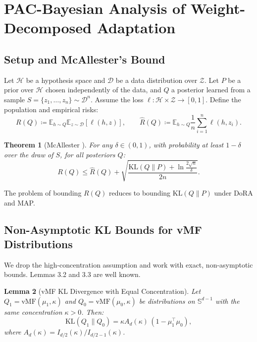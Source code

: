 \documentclass[11pt]{article}
\newtheorem{theorem}{Theorem}[section]
\newtheorem{lemma}[theorem]{Lemma}
\newcommand{\KL}{\mathrm{KL}}
\newcommand{\vMF}{\mathrm{vMF}}
\newcommand{\Ad}{A_d}
\newcommand{\Sd}{\mathbb{S}^{d-1}}
\newcommand{\E}{\mathbb{E}}
\begin{document}

\section{PAC-Bayesian Analysis of Weight-Decomposed Adaptation}
\label{sec:pac_analysis}

\subsection{Setup and McAllester's Bound}
\label{sec:setup}

Let $\mathcal{H}$ be a hypothesis space and $\mathcal{D}$ be a data
distribution over $\mathcal{Z}$.
Let $P$ be a prior over $\mathcal{H}$ chosen independently of the data,
and $Q$ a posterior learned from a sample $S = \{z_1, \ldots, z_n\} \sim
\mathcal{D}^n$.
Assume the loss $\ell : \mathcal{H} \times \mathcal{Z} \to [0,1]$.
Define the population and empirical risks:
\[
  R(Q) \coloneqq \E_{h \sim Q}\E_{z \sim \mathcal{D}}[\ell(h,z)],
  \qquad
  \hat{R}(Q) \coloneqq \E_{h \sim Q}\frac{1}{n}\sum_{i=1}^n \ell(h, z_i).
\]

\begin{theorem}[McAllester \cite{mcallester1999pac}]
\label{thm:mcallester}
For any $\delta \in (0,1)$, with probability at least $1-\delta$ over the
draw of $S$, for all posteriors $Q$:
\[
  R(Q) \leq \hat{R}(Q) + \sqrt{\frac{\KL(Q \| P) + \ln\frac{2\sqrt{n}}{\delta}}{2n}}.
\]
\end{theorem}
\noindent The problem of bounding $R(Q)$ reduces to bounding $\KL(Q \| P)$
under DoRA and MAP.

\subsection{Non-Asymptotic KL Bounds for vMF Distributions}
\label{sec:nonasymptotic}

We drop the high-concentration assumption and work with exact,
non-asymptotic bounds. Lemmas 3.2 and 3.3 are well known.

\begin{lemma}[vMF KL Divergence with Equal Concentration]
\label{lem:vmf_kl}
Let $Q_1 = \vMF(\mu_1, \kappa)$ and $Q_0 = \vMF(\mu_0, \kappa)$ be
distributions on $\Sd$ with the same concentration $\kappa > 0$.
Then:
\[
  \KL(Q_1 \| Q_0) = \kappa \Ad(\kappa)\,(1 - \mu_1^\top \mu_0),
\]
where $\Ad(\kappa) = I_{d/2}(\kappa) / I_{d/2-1}(\kappa)$.
\end{lemma}
\end{document}
